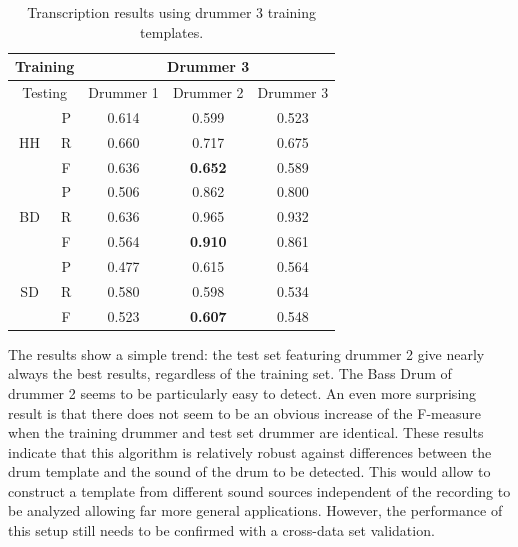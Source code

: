 \documentclass{article}
\begin{document}
\begin{table}[h]
\begin{center}
\begin{tabular}{|c|c|c|c|c|}
\hline
\multicolumn{2}{|c}{Training} & \multicolumn{3}{|c|}{Drummer 3}   \\ \hline
\multicolumn{2}{|c|}{Testing} & Drummer 1 & Drummer 2 & Drummer 3 \\ \hline
\multirow{3}{*}{HH}    & P    & 0.614     & 0.599     & 0.523     \\ \cline{2-5} 
                       & R    & 0.660     & 0.717     & 0.675     \\ \cline{2-5} 
                       & F    & 0.636     & \textbf{0.652}     & 0.589     \\ \hline
\multirow{3}{*}{BD}    & P    & 0.506     & 0.862     & 0.800     \\ \cline{2-5} 
                       & R    & 0.636     & 0.965     & 0.932     \\ \cline{2-5} 
                       & F    & 0.564     & \textbf{0.910}     & 0.861     \\ \hline
\multirow{3}{*}{SD}    & P    & 0.477     & 0.615     & 0.564     \\ \cline{2-5} 
                       & R    & 0.580     & 0.598     & 0.534     \\ \cline{2-5} 
                       & F    & 0.523     & \textbf{0.607}     & 0.548     \\ \hline
\end{tabular}
 \caption{Transcription results using drummer 3 training templates.}
 \label{tab:trainDr3}
\end{center}
\end{table}

The results show a simple trend: the test set featuring drummer 2 give nearly always the best results, regardless of the training set. The Bass Drum of drummer 2 seems to be particularly easy to detect. An even more surprising result is that there does not seem to be an obvious increase of the F-measure when the training drummer and test set drummer are identical.
These results indicate that this algorithm is relatively robust against differences between the drum template and the sound of the drum to be detected. This would allow to construct a template from different sound sources independent of the recording to be analyzed allowing far more general applications. However, the performance of this setup still needs to be confirmed with a cross-data set validation.
\end{document}
